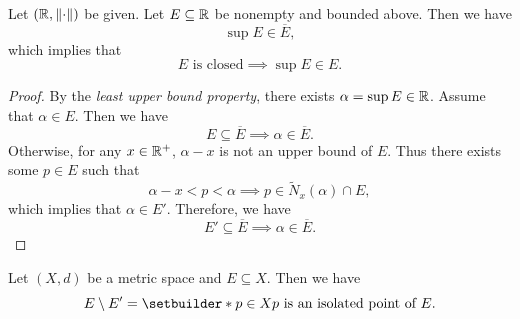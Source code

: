 \begin{theorem} \label{thm:SupremumInClosure}
    Let $\paren*{\R, \norm*{\cdot}}$ be given. Let $E \subseteq \R$ be nonempty and bounded above. Then we have
    \[
    \sup E \in \overline{E},
    \]
    which implies that
    \[
    E \text{ is closed} \implies \sup E \in E.
    \]
\end{theorem}

\begin{proof}
    By the \emph{least upper bound property},
    there exists $\alpha = \sup E \in \R$. Assume that $\alpha \in E$. Then we have
    \[
    E \subseteq \overline{E} \implies \alpha \in \overline{E}.
    \]
    Otherwise, for any $x \in \R^{+}$, $\alpha - x$ is not an upper bound of $E$.
    Thus there exists some $p \in E$ such that
    \[
    \alpha - x < p < \alpha \implies p \in \widetilde{N}_{x}(\alpha) \cap E,
    \]
    which implies that $\alpha \in E'$. Therefore, we have
    \[
    E' \subseteq \overline{E} \implies \alpha \in \overline{E}.
    \]
\end{proof}


\bigskip

\begin{theorem} \label{thm:IsolatedPoints}
    Let $(X, d)$ be a metric space and $E \subseteq X$. Then we have
    \[
    E \setminus E' = \setbuilder*{p \in X}{p \text{ is an isolated point of } E}.
    \]
\end{theorem}